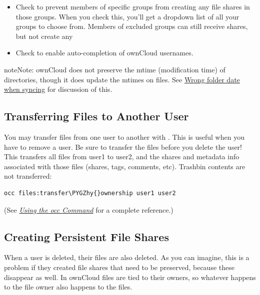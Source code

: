\documentclass[letterpaper,10pt,english]{sphinxmanual}
\def\PYGZhy{\char`\-}
\begin{document}
\begin{itemize}
\item {} 
Check  to prevent members of specific groups
from creating any file shares in those groups. When you check this, you'll
get a dropdown list of all your groups to choose from. Members of excluded
groups can still receive shares, but not create any

\item {} 
Check  to enable
auto-completion of ownCloud usernames.

\end{itemize}

\begin{notice}{note}{Note:}
ownCloud does not preserve the mtime (modification time) of
directories, though it does update the mtimes on files. See
\href{https://github.com/owncloud/core/issues/7009}{Wrong folder date when syncing} for discussion of this.
\end{notice}


\subsection{Transferring Files to Another User}
\label{configuration_files/file_sharing_configuration:transferring-files-to-another-user}\label{configuration_files/file_sharing_configuration:transfer-userfiles-label}
You may transfer files from one user to another with . This is useful
when you have to remove a user. Be sure to transfer the files before you delete
the user!  This transfers all files from user1 to user2, and the shares and
metadata info associated with those files (shares, tags, comments, etc).
Trashbin contents are not transferred:

\begin{Verbatim}[commandchars=\\\{\}]
occ files:transfer\PYGZhy{}ownership user1 user2
\end{Verbatim}

(See {\hyperref[configuration_server/occ_command::doc]{\emph{\emph{Using the occ Command}}}} for a complete 
reference.)


\subsection{Creating Persistent File Shares}
\label{configuration_files/file_sharing_configuration:creating-persistent-file-shares}
When a user is deleted, their files are also deleted. As you can imagine, this
is a problem if they created file shares that need to be preserved, because
these disappear as well. In ownCloud files are tied to their owners, so
whatever happens to the file owner also happens to the files.
\end{document}
